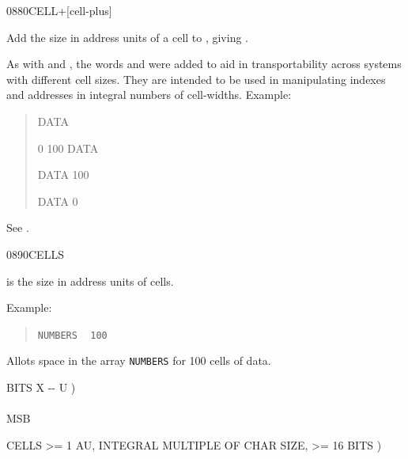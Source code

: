 \begin{worddef}{0880}{CELL+}[cell-plus]
\item {}

	Add the size in address units of a cell to , giving
	.


	\begin{rationale} %
		As with  and , the words 
		and  were added to aid in transportability across
		systems with different cell sizes. They are intended to be used
		in manipulating indexes and addresses in integral numbers of
		cell-widths. Example:
		\begin{quote}\ttfamily
			 DATA

			0 100 DATA 

			DATA   100

			DATA    0
		\end{quote}
	\end{rationale}

	\begin{testing} %
		See .
	\end{testing}
\end{worddef}


\begin{worddef}{0890}{CELLS}
\item {}

	 is the size in address units of  cells.


	\begin{rationale} %
		Example:
		\begin{quote}
			 \texttt{NUMBERS} ~
			\texttt{100}  
		\end{quote}
		Allots space in the array \texttt{NUMBERS} for 100 cells
		of data.
	\end{rationale}

	\begin{testing} %
		\ttfamily
		\word{:} BITS  X -{}- U ) \\
		     \\
		\tab[2]  MSB        \\
		\tab {} 
		\word{;}

		 CELLS >= 1 AU, INTEGRAL MULTIPLE OF CHAR SIZE, >= 16 BITS ) \\
		 \\
		 \\
	\end{testing}
\end{worddef}


